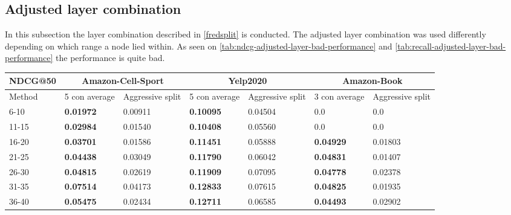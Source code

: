 \subsection{Adjusted layer combination}
In this subsection the layer combination described in \autoref{fredsplit} is conducted.
The adjusted layer combination was used differently depending on which range a node lied within.
As seen on \autoref{tab:ndcg-adjusted-layer-bad-performance} and \autoref{tab:recall-adjusted-layer-bad-performance} the performance is quite bad.
\begin{table*}[]
    \centering
    \begin{tabular}{|l|l|l||l|l||l|l|}
        \hline
        NDCG@50 & \multicolumn{2}{c||}{Amazon-Cell-Sport} & \multicolumn{2}{c||}{Yelp2020} & \multicolumn{2}{c|}{Amazon-Book}                                                          \\ \hline
        Method  & 5 con average                           & Aggressive split               & 5 con average                    & Aggressive split & 3 con average    & Aggressive split \\ \hline
        6-10    & \textbf{0.01972}                        & 0.00911                        & \textbf{0.10095}                 & 0.04504          & 0.0              & 0.0              \\ \hline
        11-15   & \textbf{0.02984}                        & 0.01540                        & \textbf{0.10408}                 & 0.05560          & 0.0              & 0.0              \\ \hline
        16-20   & \textbf{0.03701}                        & 0.01586                        & \textbf{0.11451}                 & 0.05888          & \textbf{0.04929} & 0.01803          \\ \hline
        21-25   & \textbf{0.04438}                        & 0.03049                        & \textbf{0.11790}                 & 0.06042          & \textbf{0.04831} & 0.01407          \\ \hline
        26-30   & \textbf{0.04815}                        & 0.02619                        & \textbf{0.11909}                 & 0.07095          & \textbf{0.04778} & 0.02378          \\ \hline
        31-35   & \textbf{0.07514}                        & 0.04173                        & \textbf{0.12833}                 & 0.07615          & \textbf{0.04825} & 0.01935          \\ \hline
        36-40   & \textbf{0.05475}                        & 0.02434                        & \textbf{0.12711}                 & 0.06585          & \textbf{0.04493} & 0.02902          \\ \hline

\end{tabular}
\end{table*}

